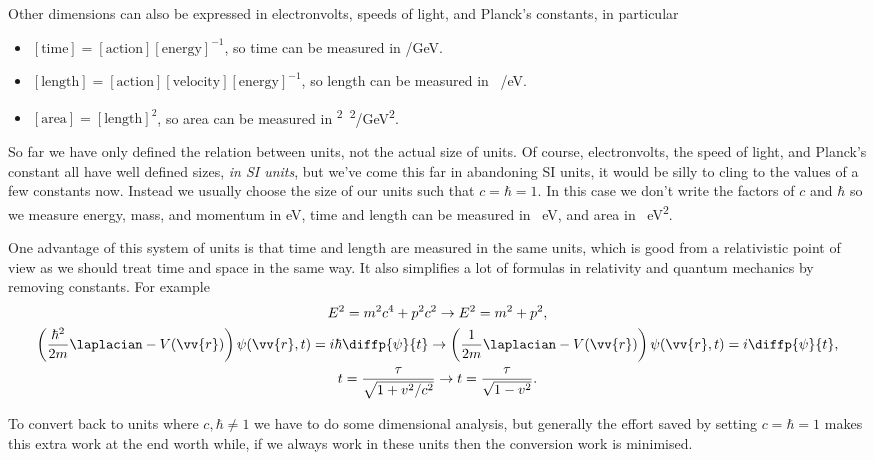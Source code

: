 \documentclass[fleqn]{NotesClass}
\begin{document}
    Other dimensions can also be expressed in electronvolts, speeds of light, and Planck's constants, in particular
    \begin{itemize}
        \item \([\mathrm{time}] = [\mathrm{action}] [\mathrm{energy}]^{-1}\), so time can be measured in \unit[per-mode=symbol]{\hbarunit\per\giga\electronvolt}.
        \item \([\mathrm{length}] = [\mathrm{action}] [\mathrm{velocity}] [\mathrm{energy}]^{-1}\), so length can be measured in \unit[per-mode=symbol]{\hbarunit\speedoflight\per\electronvolt}.
        \item \([\mathrm{area}] = [\mathrm{length}]^2\), so area can be measured in \unit[per-mode=symbol]{\hbarunit\squared\speedoflight\squared\per\giga\electronvolt\squared}.
    \end{itemize}
    
    So far we have only defined the relation between units, not the actual size of units.
    Of course, electronvolts, the speed of light, and Planck's constant all have well defined sizes, \emph{in SI units}, but we've come this far in abandoning SI units, it would be silly to cling to the values of a few constants now.
    Instead we usually choose the size of our units such that \(c = \hbar = 1\).
    In this case we don't write the factors of \(c\) and \(\hbar\) so we measure energy, mass, and momentum in \unit{\electronvolt}, time and length can be measured in \unit{\per\electronvolt}, and area in \unit{\per\electronvolt\squared}.
    
    One advantage of this system of units is that time and length are measured in the same units, which is good from a relativistic point of view as we should treat time and space in the same way.
    It also simplifies a lot of formulas in relativity and quantum mechanics by removing constants.
    For example
    \begin{gather}
        E^2 = m^2c^4 + p^2c^2 \to E^2 = m^2 + p^2,\\
        \left( \frac{\hbar^2}{2m}\laplacian - V(\vv{r})\right) \psi(\vv{r}, t) = i\hbar\diffp{\psi}{t} \to \left( \frac{1}{2m} \laplacian - V(\vv{r}) \right)\psi(\vv{r}, t) = i\diffp{\psi}{t},\\
        t = \frac{\tau}{\sqrt{1 + v^2/c^2}} \to t = \frac{\tau}{\sqrt{1 - v^2}}.
    \end{gather}
    
    To convert back to units where \(c, \hbar \ne 1\) we have to do some dimensional analysis, but generally the effort saved by setting \(c = \hbar = 1\) makes this extra work at the end worth while, if we always work in these units then the conversion work is minimised.
    
\end{document}
